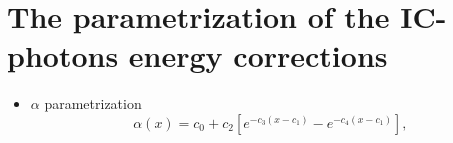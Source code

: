 

\chapter{The parametrization of the IC-photons energy corrections} \label{App:AppendixA}
\begin{itemize}
\item $\alpha$ parametrization
\vspace{-0.2in}
\begin{equation}
\alpha (x) = c_{0} + c_{2} \left[ e^{-c_{3}(x - c_{1})} - e^{-c_{4}(x - c_{1})} \right],
\end{equation}


\end{itemize}
